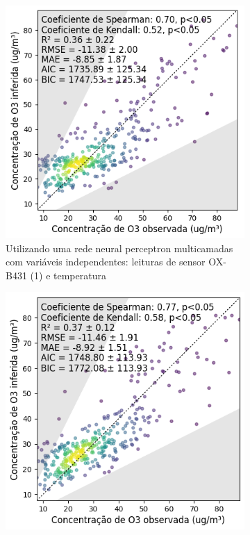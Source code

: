 \begin{figure}[h]
    \centering
    \caption{Gráfico de dispersão das leituras do múltiplos sensores e a estação de referência para medição de \acrshort{o3}}
    \begin{subfigure}{0.49\textwidth}
        \includegraphics[width=\textwidth]{chapters/4-CALIBRAÇÃO MÚLTIPLOS SENSORES/Figuras/O3-o31-T-MLP-Regression.png}
        \caption{Utilizando uma rede neural perceptron multicamadas com variáveis independentes: leituras de sensor OX-B431 (1) e temperatura}
        \label{fig:data-o31-T-reference-O3-corr-MLP}
    \end{subfigure}
    \hfill
    \begin{subfigure}{0.49\textwidth}
        \includegraphics[width=\textwidth]{chapters/4-CALIBRAÇÃO MÚLTIPLOS SENSORES/Figuras/O3-co-no2-o31-pm10-T-RF-Regression.png}

\end{subfigure}
\end{figure}
